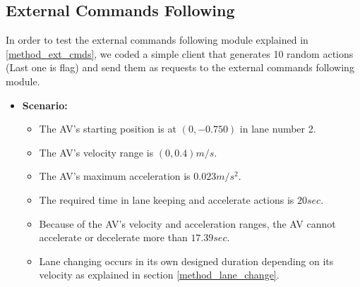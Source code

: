 \subsection{External Commands Following}
\label{test_ext_cmds}
In order to test the external commands following module explained in \ref{method_ext_cmds}, we coded a simple client that generates 10 random actions (Last one is flag) and send them as requests to the external commands following module.
\begin{itemize}
    \item \textbf{Scenario:} 
    \begin{itemize}
        \item The AV's starting position is at $(0,-0.750)$ in lane number 2. 
        \item The AV's velocity range is $(0,0.4) m/s$.
        \item The AV's maximum acceleration is $0.023  m/s^{2}$.
        \item The required time in lane keeping and accelerate actions is $20 sec$.
        \item Because of the AV's velocity and acceleration ranges, the AV cannot accelerate or decelerate more than $17.39 sec$. 
        \item Lane changing occurs in its own designed duration depending on its velocity as explained in section \ref{method_lane_change}. 
    \end{itemize}


\end{itemize}
